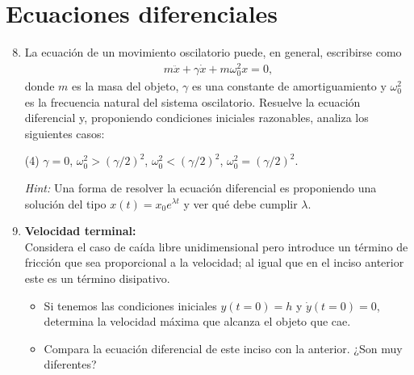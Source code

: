 \documentclass[letterpaper]{article}
\newcommand{\salirmodo}{\leavevmode \\}
\begin{document}
\section*{Ecuaciones diferenciales}
\begin{enumerate}[label={\textbf{3.\arabic*)}}]
    \setcounter{enumi}{7}
    \item La ecuación de un movimiento oscilatorio puede, en general, escribirse como
    \begin{align*}
       m \ddot{x} + \gamma \dot{x} + m\omega_{0}^{2}x = 0,
    \end{align*}
    donde \(m\) es la masa del objeto, \(\gamma\) es una constante de amortiguamiento y \(\omega_{0}^{2}\) es la frecuencia natural del sistema oscilatorio. Resuelve la ecuación diferencial y, proponiendo condiciones iniciales razonables, analiza los siguientes casos:
    \begin{tasks}(4)
        \task \(\gamma = 0\),
        \task \(\omega_{0}^{2}>(\gamma/2)^{2}\),
        \task \(\omega_{0}^{2}<(\gamma/2)^{2}\),
        \task \(\omega_{0}^{2}=(\gamma/2)^{2}\).
    \end{tasks}
    \textit{Hint:} Una forma de resolver la ecuación diferencial es proponiendo una solución del tipo \(x(t)= x_{0}e^{\lambda t}\) y ver qué debe cumplir \(\lambda\).\salirmodo
    \item \textbf{Velocidad terminal:}\\
    Considera el caso de caída libre unidimensional pero introduce un término de fricción que sea proporcional a la velocidad; al igual que en el inciso anterior este es un término disipativo.
    \begin{itemize}[label = \textbullet]
    \item  Si tenemos las condiciones iniciales \(y(t=0) = h\) y \(\dot{y}(t=0) = 0\), determina la velocidad máxima que alcanza el objeto que cae.
    \item Compara la ecuación diferencial de este inciso con la anterior. ¿Son muy diferentes?
    \end{itemize}\salirmodo
\end{enumerate}
\end{document}
